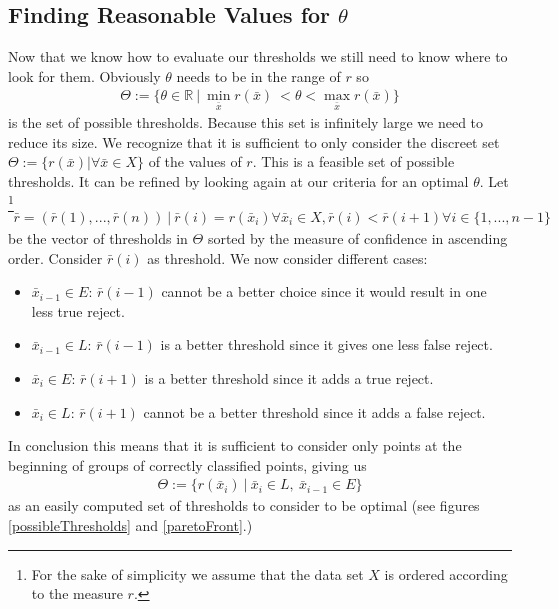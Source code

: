 \subsection{Finding Reasonable Values for $\theta$}
\label{findt}
Now that we know how to evaluate our thresholds we still need to know where to look for them. Obviously $\theta$ needs to be in the range of $r$ so
\begin{align}
\Theta := \{\theta \in \mathbb{R} \ | \ \operatorname*{min}_{\bar{x}} r(\bar{x})\ < \theta < \operatorname*{max}_{\bar{x}} r(\bar{x})\}
\end{align}
is the set of possible thresholds. Because this set is infinitely large we need to reduce its size. We recognize that it is sufficient to only consider the discreet set $\Theta := \{r(\bar{x}) | \forall \bar{x} \in X\}$ of the values of $r$. This is a feasible set of possible thresholds. It can be refined by looking again at our criteria for an optimal $\theta$. Let \footnote{For the sake of simplicity we assume that the data set $X$ is ordered according to the measure $r$.}
\begin{align}
\bar{r} = (\bar{r}(1),...,\bar{r}(n)) \ | \ \bar{r}(i)= r(\bar{x}_i) \forall \bar{x}_i \in X, \bar{r}(i) < \bar{r}(i+1) \forall i \in \{1,...,n-1\}
\end{align}
be the vector of thresholds in $\Theta$ sorted by the measure of confidence in ascending order. Consider $\bar{r}(i)$ as threshold. We now consider different cases:
\begin{itemize}
	\item $\bar{x}_{i-1} \in E$: $\bar{r}(i-1)$ cannot be a better choice since it would result in one less true reject.
	\item $\bar{x}_{i-1} \in L$: $\bar{r}(i-1)$ is a better threshold since it gives one less false reject.
	\item $\bar{x}_i \in E$: $ \bar{r}(i+1)$ is a better threshold since it adds a true reject.
	\item $\bar{x}_i \in L$: $ \bar{r}(i+1)$ cannot be a better threshold since it adds a false reject.
\end{itemize} 
In conclusion this means that it is sufficient to consider only points at the beginning of groups of correctly classified points, giving us
\begin{align}
\Theta := \{r(\bar{x}_i) \ | \ \bar{x}_i \in L, \ \bar{x}_{i-1} \in E\}
\end{align}
as an easily computed set of thresholds to consider to be optimal (see figures \ref{possibleThresholds} and \ref{paretoFront}.)

